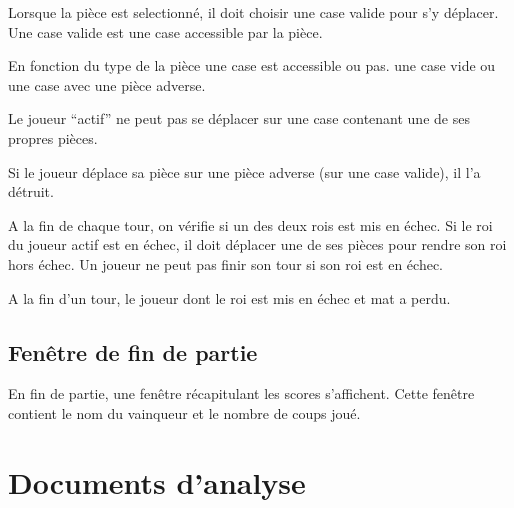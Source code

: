 \documentclass[11pt,a4paper]{report}
\begin{document}
Lorsque la pièce est selectionné, il doit choisir une case valide pour s'y déplacer. Une case valide est une case accessible par la pièce.

En fonction du type de la pièce une case est accessible ou pas. une case vide ou une case avec une pièce adverse.

Le joueur ``actif'' ne peut pas se déplacer sur une case contenant une de ses propres pièces.

Si le joueur déplace sa pièce sur une pièce adverse (sur une case valide), il l’a détruit.

A la fin de chaque tour, on vérifie si un des deux rois est mis en échec. Si le roi du joueur actif est en échec,
il doit déplacer une de ses pièces pour rendre son roi hors échec. Un joueur ne peut pas finir son tour si son roi est en échec.

A la fin d’un tour, le  joueur dont le roi est mis en échec et mat a perdu.

\section*{Fenêtre de fin de partie}
En fin de partie, une fenêtre récapitulant les scores s’affichent. Cette fenêtre contient le nom du vainqueur et le nombre de coups joué.

\maketitle
\chapter*{Documents d'analyse}
\end{document}
